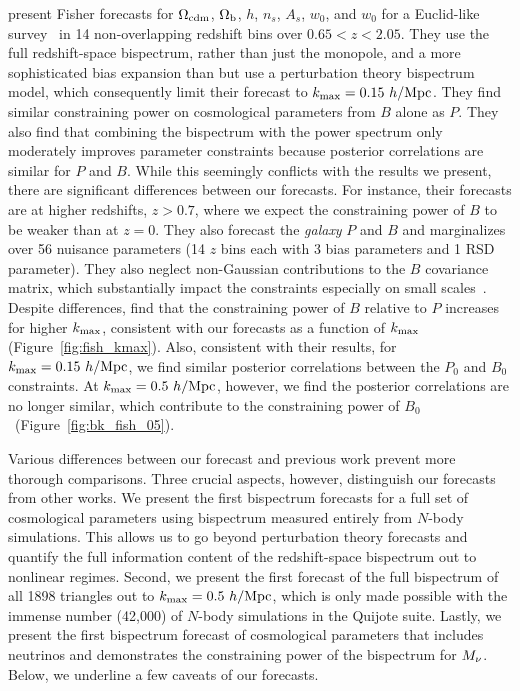 \cite{yankelevich2019} present Fisher forecasts for $\Omega_{\rm cdm}$, $\Omega_{\rm b}$, 
$h$, $n_s$, $A_s$, $w_0$, and $w_0$ for a 
Euclid-like survey~\citep{laureijs2011} in 14 non-overlapping redshift 
bins over $0.65 < z < 2.05$. They use the full redshift-space bispectrum,
rather than just the monopole, and a more sophisticated bias expansion 
than \cite{sefusatti2006} but use a perturbation theory bispectrum model, 
which consequently limit their forecast to $k_{\rm max} = 0.15~h/{\rm Mpc}$. 
They find similar constraining power on cosmological parameters from $B$ 
alone as $P$.  They also find that combining the bispectrum with the power 
spectrum only moderately improves parameter constraints because posterior 
correlations are similar for $P$ and $B$. While this seemingly conflicts 
with the results we present, there are significant differences between our 
forecasts. For instance, their forecasts are at higher redshifts, $z > 0.7$,
where we expect the constraining power of $B$ to be weaker than at $z=0$. 
They also forecast the {\em galaxy} $P$ and $B$ and marginalizes over 
56 nuisance parameters (14 $z$ bins each with 3 bias parameters and 1 
RSD parameter). They also neglect non-Gaussian contributions to the $B$ 
covariance matrix, which substantially impact the constraints especially 
on small scales~\citep{chan2017}. %
Despite differences, \cite{yankelevich2019} find that the constraining 
power of $B$ relative to $P$ increases for higher $k_{\rm max}$, consistent 
with our forecasts as a function of $k_{\rm max}$ (Figure~\ref{fig:fish_kmax}). 
Also, consistent with their results, for $k_{\rm max} = 0.15~h/{\rm Mpc}$, 
we find similar posterior correlations between the $P_0$ and $B_0$ 
constraints. At $k_{\rm max} = 0.5~h/{\rm Mpc}$, however, we find the posterior 
correlations are no longer similar, which contribute to the constraining
power of $B_0$~(Figure~\ref{fig:bk_fish_05}).

Various differences between our forecast and previous work prevent more 
thorough comparisons. Three crucial aspects, however, distinguish our
forecasts from other works. We present the first bispectrum forecasts 
for a full set of cosmological parameters using bispectrum measured entirely 
from $N$-body simulations. This allows us to go beyond perturbation theory 
forecasts and quantify the full information content of the redshift-space 
bispectrum out to nonlinear regimes. Second, we present the first forecast 
of the full bispectrum of all 1898 triangles out to $k_{\rm max} = 0.5~h/{\rm Mpc}$, 
which is only made possible with the immense number (42,000) of $N$-body
simulations in the Quijote suite. Lastly, we present the first bispectrum 
forecast of cosmological parameters that includes neutrinos and demonstrates 
the constraining power of the bispectrum for $M_\nu$. Below, we underline a 
few caveats of our forecasts.

